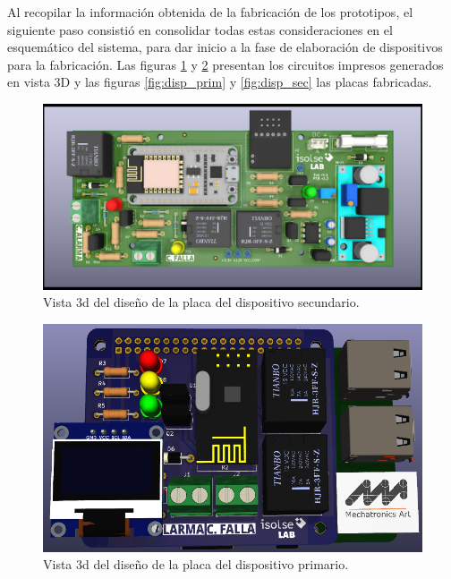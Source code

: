 Al recopilar la información obtenida de la fabricación de los prototipos, el siguiente paso consistió en consolidar todas estas consideraciones en el esquemático del sistema, para dar inicio a la fase de elaboración de dispositivos para la fabricación. Las figuras \ref{fig:figura_h} y \ref{fig:figura_i} presentan los circuitos impresos generados en vista 3D y las figuras \ref{fig:disp_prim} y \ref{fig:disp_sec} las placas fabricadas.

\begin{figure}[ht]
	\centering
	\includegraphics[scale=.25]{./Figures/Capitulo4/Figura_H.png}
	\caption{Vista 3d del diseño de la placa del dispositivo secundario.}
	\label{fig:figura_h}
\end{figure}

\begin{figure}[ht]
	\centering
	\includegraphics[scale=.3]{./Figures/Capitulo4/Figura_I.png}
	\caption{Vista 3d del diseño de la placa del dispositivo primario.}
	\label{fig:figura_i}
\end{figure}

